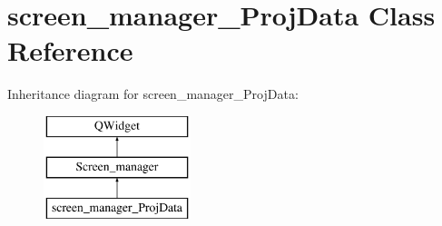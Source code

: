 \hypertarget{classscreen__manager__ProjData}{}\section{screen\+\_\+manager\+\_\+\+Proj\+Data Class Reference}
\label{classscreen__manager__ProjData}
Inheritance diagram for screen\+\_\+manager\+\_\+\+Proj\+Data\+:\begin{figure}[H]
\begin{center}
\leavevmode
\includegraphics[height=3.000000cm]{classscreen__manager__ProjData}
\end{center}
\end{figure}
